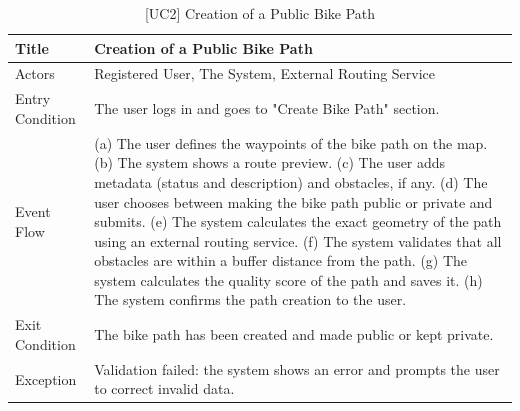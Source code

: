 \begin{table}[H]
    \centering
    \begin{tabular}{|p{4cm}|p{10cm}|}
        \hline
        Title & \textbf{Creation of a Public Bike Path} \\
        \hline
        Actors & Registered User, The System, External Routing Service \\
        \hline
        Entry Condition & The user logs in and goes to "Create Bike Path" section. \\
        \hline
        Event Flow & 
        (a) The user defines the waypoints of the bike path on the map. \newline
        (b) The system shows a route preview. \newline
        (c) The user adds metadata (status and description) and obstacles, if any. \newline
        (d) The user chooses between making the bike path public or private and submits. \newline
        (e) The system calculates the exact geometry of the path using an external routing service. \newline
        (f) The system validates that all obstacles are within a buffer distance from the path. \newline
        (g) The system calculates the quality score of the path and saves it. \newline
        (h) The system confirms the path creation to the user. \\
        \hline
        Exit Condition & The bike path has been created and made public or kept private. \\
        \hline
        Exception & 
        Validation failed: the system shows an error and prompts the user to correct invalid data. \\
        \hline
    \end{tabular}
    \caption{[UC2] Creation of a Public Bike Path}
    \label{tab:uc2}
\end{table}

